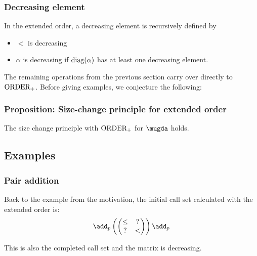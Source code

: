\subsubsection{Decreasing element}
In the extended order, a decreasing element is recursively defined by
\begin{itemize}
\item
$<$ is decreasing
\item
$\alpha$ is decreasing if $\operatorname{diag}(\alpha)$ has at least one decreasing element.
\end{itemize}

The remaining operations from the previous section carry over directly to $\operatorname{ORDER_{+}}$.
\noindent Before giving examples, we conjecture the following:
\subsubsection{Proposition: Size-change principle for extended order}
The size change principle with $\operatorname{ORDER_{+}}$ for $\mugda$ holds.

\subsection{Examples}

\subsubsection{Pair addition}
Back to the example from the motivation, the initial call set calculated with the extended order is:
\[
\add_p\begin{pmatrix}
\begin{pmatrix}
\leq & ? \\
?    & < \\
\end{pmatrix}
\end{pmatrix}\add_p
\]

\noindent This is also the completed call set and the matrix is decreasing.

